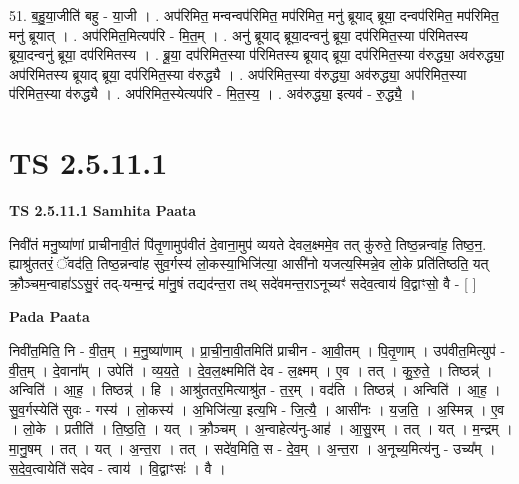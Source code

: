 \documentclass[17pt]{extarticle}
\begin{document}
51. ब॒हु॒या॒जीति॑ बहु - या॒जी । . अप॑रिमित॒ मन्वन्वप॑रिमित॒ मप॑रिमित॒ मनु॑ ब्रूयाद् ब्रूया॒ दन्वप॑रिमित॒ मप॑रिमित॒ मनु॑ ब्रूयात् । . अप॑रिमित॒मित्यप॑रि - मि॒त॒म् । . अनु॑ ब्रूयाद् ब्रूया॒दन्वनु॑ ब्रूया॒ दप॑रिमित॒स्या प॑रिमितस्य ब्रूया॒दन्वनु॑ ब्रूया॒ दप॑रिमितस्य । . ब्रू॒या॒ दप॑रिमित॒स्या प॑रिमितस्य ब्रूयाद् ब्रूया॒ दप॑रिमित॒स्या व॑रुद्ध्या॒ अव॑रुद्ध्या॒ अप॑रिमितस्य ब्रूयाद् ब्रूया॒ दप॑रिमित॒स्या व॑रुद्ध्यै । . अप॑रिमित॒स्या व॑रुद्ध्या॒ अव॑रुद्ध्या॒ अप॑रिमित॒स्या प॑रिमित॒स्या व॑रुद्ध्यै । . अप॑रिमित॒स्येत्यप॑रि - मि॒त॒स्य॒ । . अव॑रुद्ध्या॒ इत्यव॑ - रु॒द्ध्यै॒ । \newline
\pagebreak
{}

\section{ TS 2.5.11.1 }

\textbf{TS 2.5.11.1 } \newline
\textbf{Samhita Paata} \newline

निवी॑तं मनु॒ष्या॑णां प्राचीनावी॒तं पि॑तृ॒णामुप॑वीतं दे॒वाना॒मुप॑ व्ययते देवल॒क्ष्ममे॒व तत् कु॑रुते॒ तिष्ठ॒न्नन्वा॑ह॒ तिष्ठ॒न॒. ह्याश्रु॑ततरं॒ ॅवद॑ति॒ तिष्ठ॒न्नन्वा॑ह सुव॒र्गस्य॑ लो॒कस्या॒भिजि॑त्या॒ आसी॑नो यजत्य॒स्मिन्ने॒व लो॒के प्रति॑तिष्ठति॒ यत् क्रौ॒ञ्चम॒न्वाहा॑ऽऽसु॒रं तद्-यन्म॒न्द्रं मा॑नु॒षं तद्यद॑न्त॒रा तथ् सदे॑वमन्त॒राऽनूच्यꣳ॑ सदेव॒त्वाय॑ वि॒द्वाꣳसो॒ वै - [  ] \newline

\textbf{Pada Paata} \newline

निवी॑त॒मिति॒ नि - वी॒त॒म् । म॒नु॒ष्या॑णाम् । प्रा॒ची॒ना॒वी॒तमिति॑ प्राचीन - आ॒वी॒तम् । पि॒तृ॒णाम् । उप॑वीत॒मित्युप॑ - वी॒त॒म् । दे॒वाना᳚म् । उपेति॑ । व्य॒य॒ते॒ । दे॒व॒ल॒क्ष्ममिति॑ देव - ल॒क्ष्मम् । ए॒व । तत् । कु॒रु॒ते॒ । तिष्ठन्न्॑ । अन्विति॑ । आ॒ह॒ । तिष्ठन्न्॑ । हि । आश्रु॑ततर॒मित्याश्रु॑त - त॒र॒म् । वद॑ति । तिष्ठन्न्॑ । अन्विति॑ । आ॒ह॒ । सु॒व॒र्गस्येति॑ सुवः - गस्य॑ । लो॒कस्य॑ । अ॒भिजि॑त्या॒ इत्य॒भि - जि॒त्यै॒ । आसी॑नः । य॒ज॒ति॒ । अ॒स्मिन्न् । ए॒व । लो॒के । प्रतीति॑ । ति॒ष्ठ॒ति॒ । यत् । क्रौ॒ञ्चम् । अ॒न्वाहेत्य॑नु-आह॑ । आ॒सु॒रम् । तत् । यत् । म॒न्द्रम् । मा॒नु॒षम् । तत् । यत् । अ॒न्त॒रा । तत् । सदे॑व॒मिति॒ स - दे॒व॒म् । अ॒न्त॒रा । अ॒नूच्य॒मित्य॑नु - उच्य᳚म् । स॒दे॒व॒त्वायेति॑ सदेव - त्वाय॑ । वि॒द्वाꣳसः॑ । वै ।  \newline
\end{document}
